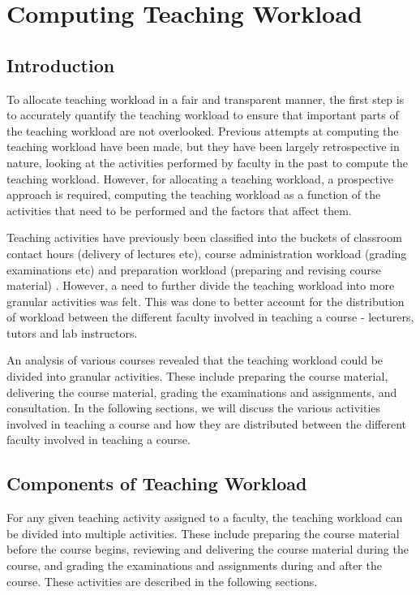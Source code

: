 \chapter{Computing Teaching Workload}
\label{ch:teaching_workload}

\section{Introduction}

To allocate teaching workload in a fair and transparent manner, the first step is to accurately quantify the teaching workload to ensure that important parts of the teaching workload are not overlooked. Previous attempts at computing the teaching workload have been made, but they have been largely retrospective in nature, looking at the activities performed by faculty in the past to compute the teaching workload. However, for allocating a teaching workload, a prospective approach is required, computing the teaching workload as a function of the activities that need to be performed and the factors that affect them.

Teaching activities have previously been classified into the buckets of classroom contact hours (delivery of lectures etc), course administration workload (grading examinations etc) and preparation workload (preparing and revising course material) \cite{griffith2020framework}. However, a need to further divide the teaching workload into more granular activities was felt. This was done to better account for the distribution of workload between the different faculty involved in teaching a course - lecturers, tutors and lab instructors.

An analysis of various courses revealed that the teaching workload could be divided into granular activities. These include preparing the course material, delivering the course material, grading the examinations and assignments, and consultation. In the following sections, we will discuss the various activities involved in teaching a course and how they are distributed between the different faculty involved in teaching a course.

\section{Components of Teaching Workload}

For any given teaching activity assigned to a faculty, the teaching workload can be divided into multiple activities. These include preparing the course material before the course begins, reviewing and delivering the course material during the course, and grading the examinations and assignments during and after the course. These activities are described in the following sections.

